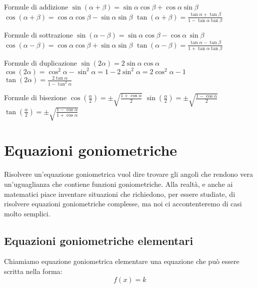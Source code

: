 \begin{itemize*}
 \item Formule di addizione
  \subitem \(\sin(\alpha + \beta)=\sin\alpha \cos\beta + \cos\alpha \sin\beta\)
  \subitem \(\cos(\alpha + \beta)=\cos\alpha \cos\beta - \sin\alpha \sin\beta\)
  \subitem \(\tan(\alpha + \beta)=\frac {\tan\alpha + \tan\beta} 
                                        {1 - \tan\alpha \tan\beta}\)
 \item Formule di sottrazione
  \subitem \(\sin(\alpha - \beta)=\sin\alpha \cos\beta - \cos\alpha \, 
\sin\beta\)
  \subitem \(\cos(\alpha - \beta)=\cos\alpha \cos\beta + \sin\alpha \sin\beta\)
  \subitem \(\tan(\alpha - \beta)=\frac {\tan\alpha - \tan\beta} 
                                        {1 + \tan\alpha \tan\beta}\)
 \item Formule di duplicazione
  \subitem \(\sin(2\alpha)=2\sin\alpha \cos\alpha\)
  \subitem \(\cos(2\alpha)=\cos^2\alpha - \sin^2\alpha = 1 - 2\sin^{2}\alpha = 
            2\cos^{2}\alpha - 1\)
  \subitem \(\tan(2\alpha)=\frac{2\tan\alpha}{1 - \tan^2\alpha}\)
 \item Formule di bisezione
  \subitem \(\cos\left(\frac{\alpha} 2\right)=\pm\sqrt{\frac{1+\cos\alpha}{2} 
}\)
  \subitem \(\sin\left(\frac{\alpha} 2\right)=\pm\sqrt{\frac{1-\cos\alpha}{2} 
}\)
  \subitem \(\tan\left(\frac{\alpha} 2\right)=\pm\sqrt{\frac{1-\cos\alpha}
                                                           {1+\cos\alpha}}\)
\end{itemize*}

\section{Equazioni goniometriche}
\label{sec:gonio_equazionigonio}

Risolvere un'equazione goniometrica vuol dire trovare gli angoli che rendono 
vera un'uguaglianza che contiene funzioni goniometriche. 
Alla realtà, e anche ai matematici piace inventare situazioni che richiedono, 
per essere studiate, di risolvere equazioni goniometriche complesse, ma noi 
ci 
accontenteremo di casi molto semplici.

\subsection{Equazioni goniometriche elementari}

Chiamiamo equazione goniometrica elementare una equazione che può essere 
scritta nella forma:
\[f(x)=k\]

